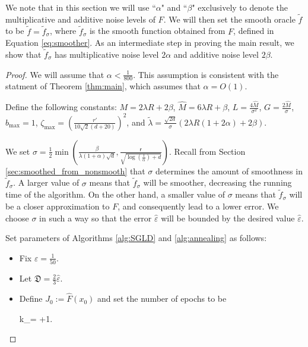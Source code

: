 \documentclass[final,12pt]{colt2018} %
\def \be{\begin{equs}}
\def \ee{\end{equs}}
\begin{document}
{We note that in this section we will use ``$\alpha$"  and ``$\beta$" exclusively to denote the multiplicative and additive noise levels of $F$.  We will then set the smooth oracle $\tilde{f}$ to be $\tilde{f} = \tilde{f}_\sigma$, where $\tilde{f}_\sigma$ is the smooth function obtained from $F$,  defined in Equation  \eqref{eq:smoother}. As an intermediate step in proving the main result, we show that $\tilde{f}_\sigma$ has multiplicative noise level $2\alpha$ and additive noise level $2\beta$.

\begin{proof}
We will assume that $\alpha<\frac{1}{800}$.  This assumption is consistent with the statment of Theorem \ref{thm:main}, which assumes that $\alpha = O(1)$. 

Define the following constants: $M = 2 \lambda R + 2 \beta$, $\hat{M}= 6 \lambda R + \beta$, $L= \frac{4 \hat{M}}{\sigma^2}$, $G= \frac{2\hat{M}}{\sigma}$, $b_{\textrm{max}}=1$, $\zeta_{\textrm{max}} =  \left(\frac{r'}{10\sqrt{2}(d+20)}\right)^2$, and $\tilde{\lambda} = \frac{\sqrt{2d}}{\sigma} (2 \lambda R(1+ 2\alpha) + 2\beta)$.


We set $\sigma = \frac{1}{2} \min\left(\frac{\beta}{\lambda(1+\alpha)\sqrt{d}}, \frac{\mathsf{r}}{\sqrt{\log(\frac{1}{\alpha})+d}}\right)$.  Recall from Section \ref{sec:smoothed_from_nonsmooth} that $\sigma$ determines the amount of smoothness in $\tilde{f}_\sigma$.  A larger value of $\sigma$ means that $\tilde{f}_\sigma$ will be smoother, decreasing the running time of the algorithm. On the other hand, a smaller value of $\sigma$ means that $\tilde{f}_\sigma$ will be a closer approximation to $F$, and consequently lead to a lower error.  We choose $\sigma$ in such a way so that the error $\hat{\varepsilon}$  will be bounded by the desired value $\hat{\varepsilon}$.

 

Set parameters of Algorithms \ref{alg:SGLD} and \ref{alg:annealing} as follows: 

\begin{itemize}
\item Fix $\varepsilon = \frac{1}{50}$.

\item Let $\mathfrak{D} = \frac{2}{3}\hat{\varepsilon}$.

\item Define $J_0 := \hat{F}(x_0)$ and set the number of epochs to be
\be\label{eq:k_max}
k_{}= \left\lceil {}\right\rceil+1.
\ee



\end{itemize}
\end{proof}}
\end{document}
